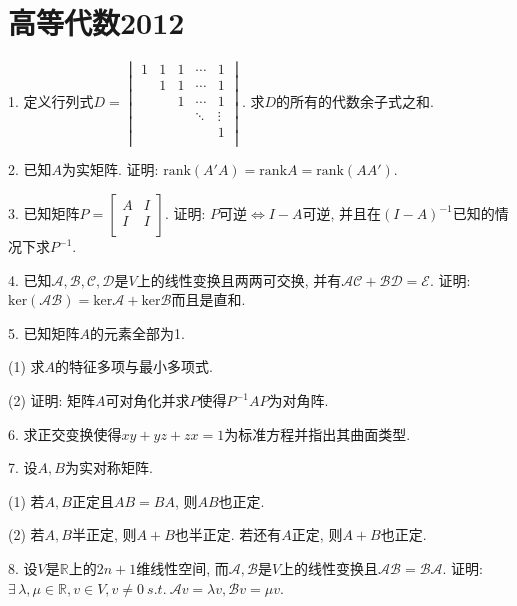 \documentclass[12pt, a4paper, twoside]{ctexart}%
\begin{document}
	\section{高等代数2012}
	1. 定义行列式$D=\begin{vmatrix}
		1&1&1&\cdots&1\\
		 &1&1&\cdots&1\\
		 & &1&\cdots&1\\
		 & & &\ddots&\vdots\\
		 & & & &1\\
	\end{vmatrix}$. 求$D$的所有的代数余子式之和.\par
	2. 已知$A$为实矩阵. 证明: $\mathrm{rank}\left(A'A\right)=\mathrm{rank}A=\mathrm{rank}\left(AA'\right)$.\par 
	3. 已知矩阵$P=\begin{bmatrix}
		A&I\\
		I&I\\
	\end{bmatrix}$. 证明: $P$可逆$\iff I-A$可逆, 并且在$(I-A)^{-1}$已知的情况下求$P^{-1}$.\par 
	4. 已知$\mathscr{A,B,C,D}$是$V$上的线性变换且两两可交换, 并有$\mathscr{AC+BD=E}$. 证明: $\mathrm{ker}(\mathscr{AB})=\mathrm{ker}\mathscr{A}+\mathrm{ker}\mathscr{B}$而且是直和.\par
	5. 已知矩阵$A$的元素全部为1.\par
	\hspace{1.2em}(1) 求$A$的特征多项与最小多项式. \par
	\hspace{1.2em}(2) 证明: 矩阵$A$可对角化并求$P$使得$P^{-1}AP$为对角阵.\par
	6. 求正交变换使得$xy+yz+zx=1$为标准方程并指出其曲面类型.\par
	7. 设$A,B$为实对称矩阵. \par
	\hspace{1.2em}(1) 若$A,B$正定且$AB=BA$, 则$AB$也正定.\par
	\hspace{1.2em}(2) 若$A,B$半正定, 则$A+B$也半正定. 若还有$A$正定, 则$A+B$也正定.\par
	8. 设$V$是$\mathbb{R}$上的$2n+1$维线性空间, 而$\mathscr{A,B}$是$V$上的线性变换且$\mathscr{AB}=\mathscr{BA}$. 证明: $\exists\, \lambda,\mu\in\mathbb{R}, v\in V, v\neq0\ s.t.\ \mathscr{A}v=\lambda v, \mathscr{B}v=\mu v$.\par 
	
	\clearpage
\end{document}
